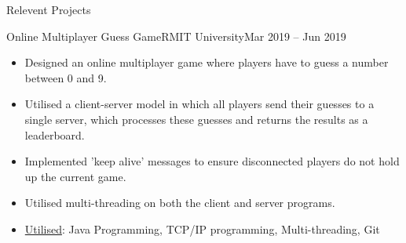 \documentclass[]{mcdowellcv}
\begin{document}
\begin{cvsection}{Relevent Projects}
		\begin{cvsubsection}{Online Multiplayer Guess Game}{RMIT University}{Mar 2019 -- Jun 2019}
			\begin{itemize}
				\item Designed an online multiplayer game where players have to guess a number between 0 and 9.
				\item Utilised a client-server model in which all players send their guesses to a single server, which processes these guesses and returns the results as a leaderboard.
				\item Implemented 'keep alive' messages to ensure disconnected players do not hold up the current game.
				\item Utilised multi-threading on both the client and server programs.
				\item \underline{Utilised}: Java Programming, TCP/IP programming, Multi-threading, Git
			\end{itemize}
		\end{cvsubsection}
\iffalse
-Worked in a team of four to develop a real time traffic controller system for two four-way intersections separated by a train crossing.
-The intersections were represented by a custom PCB our team designed and created, utilising NeoPixel LEDs as our traffic lights and push buttons as our pedestrian buttons. 
-The system itself was controlled by four separate micro-controller nodes (DE-10 Nano) running the QNX real time operating system, one for each intersection, one for the train crossing and one more as the controlling/watchdog system. 
-Each node was heavily multi threaded and networked IPC was utilised to communicate between nodes. 
-Node failure was accounted for in the design, with fail safe mechanisms employed to stop potentially dangerous scenarios, e.g. if the train crossing controller node went offline, the adjacent intersections would not route traffic towards the crossing.
-The lights realistically change, transitioning from green to yellow to red in real time, with the transitions being triggered by either timers, or the pedestrian buttons depending on the mode.
-The controller node featured a command line interface, which allowed individual control over each other nodes mode, light configuration and timing. 
\fi


\end{cvsection}
\end{document}

